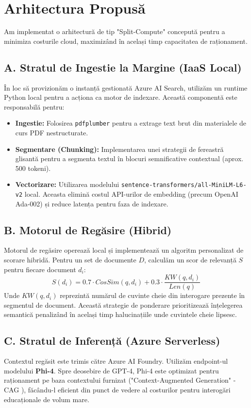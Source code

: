 \documentclass[conference]{IEEEtran}
\begin{document}
\section{Arhitectura Propusă}

Am implementat o arhitectură de tip "Split-Compute" concepută pentru a minimiza costurile cloud, maximizând în același timp capacitatea de raționament.

\subsection{A. Stratul de Ingestie la Margine (IaaS Local)}
În loc să provizionăm o instanță gestionată Azure AI Search, utilizăm un runtime Python local pentru a acționa ca motor de indexare. Această componentă este responsabilă pentru:
\begin{itemize}
    \item \textbf{Ingestie:} Folosirea \texttt{pdfplumber} pentru a extrage text brut din materialele de curs PDF nestructurate.
    \item \textbf{Segmentare (Chunking):} Implementarea unei strategii de fereastră glisantă pentru a segmenta textul în blocuri semnificative contextual (aprox. 500 tokeni).
    \item \textbf{Vectorizare:} Utilizarea modelului \texttt{sentence-transformers/all-MiniLM-L6-v2} local. Aceasta elimină costul API-urilor de embedding (precum OpenAI Ada-002) și reduce latența pentru faza de indexare.
\end{itemize}

\subsection{B. Motorul de Regăsire (Hibrid)}
Motorul de regăsire operează local și implementează un algoritm personalizat de scorare hibridă. Pentru un set de documente $D$, calculăm un scor de relevanță $S$ pentru fiecare document $d_i$:
\begin{equation}
S(d_i) = 0.7 \cdot CosSim(q, d_i) + 0.3 \cdot \frac{KW(q, d_i)}{Len(q)}
\end{equation}
Unde $KW(q, d_i)$ reprezintă numărul de cuvinte cheie din interogare prezente în segmentul de document. Această strategie de ponderare prioritizează înțelegerea semantică penalizând în același timp halucinațiile unde cuvintele cheie lipsesc.

\subsection{C. Stratul de Inferență (Azure Serverless)}
Contextul regăsit este trimis către Azure AI Foundry. Utilizăm endpoint-ul modelului \textbf{Phi-4}. Spre deosebire de GPT-4, Phi-4 este optimizat pentru raționament pe baza contextului furnizat ("Context-Augmented Generation" - CAG \cite{curs6}), făcându-l eficient din punct de vedere al costurilor pentru interogări educaționale de volum mare.
\end{document}
